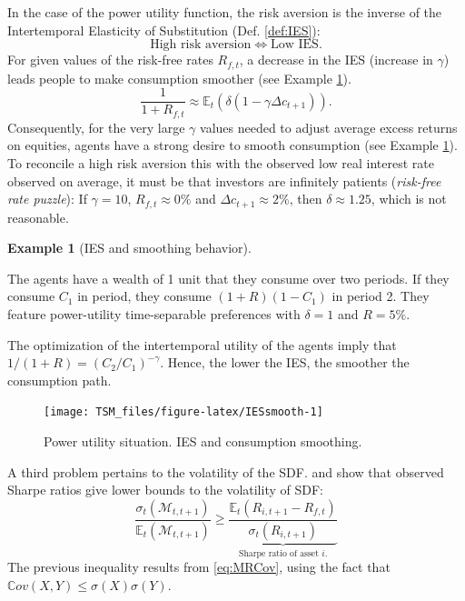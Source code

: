 \documentclass[
  12pt,
]{book}
\theoremstyle{definition}
\theoremstyle{definition}
\newtheorem{example}{Example}[chapter]
\theoremstyle{definition}
\theoremstyle{definition}
\theoremstyle{remark}
\begin{document}
In the case of the power utility function, the risk aversion is the inverse of the Intertemporal Elasticity of Substitution (Def. \ref{def:IES}):
\[
\mbox{High risk aversion} \Leftrightarrow \mbox{Low IES}.
\]
For given values of the risk-free rates \(R_{f,t}\), a decrease in the IES (increase in \(\gamma\)) leads people to make consumption smoother (see Example \ref{exm:IESsmoothing}).
\[
\frac{1}{1+R_{f,t}} \approx \mathbb{E}_t(\delta (1 - \gamma \Delta c_{t+1})).
\]
Consequently, for the very large \(\gamma\) values needed to adjust average excess returns on equities, agents have a strong desire to smooth consumption (see Example \ref{exm:IESsmoothing}). To reconcile a high risk aversion this with the observed low real interest rate observed on average, it must be that investors are infinitely patients (\emph{risk-free rate puzzle}):
If \(\gamma=10\), \(R_{f,t} \approx 0\%\) and \(\Delta c_{t+1} \approx 2\%\), then \(\delta \approx 1.25\), which is not reasonable.

\begin{example}[IES and smoothing behavior]
\protect\hypertarget{exm:IESsmoothing}{}\label{exm:IESsmoothing}

The agents have a wealth of 1 unit that they consume over two periods. If they consume \(C_1\) in period, they consume \((1+R)(1-C_1)\) in period 2. They feature power-utility time-separable preferences with \(\delta=1\) and \(R=5\%\).

The optimization of the intertemporal utility of the agents imply that \(1/(1+R)=(C_2/C_1)^{-\gamma}\). Hence, the lower the IES, the smoother the consumption path.

\begin{figure}
\texttt{[image: TSM\_files/figure-latex/IESsmooth-1]} \caption{Power utility situation. IES and consumption smoothing.}\label{fig:IESsmooth}
\end{figure}

\end{example}

A third problem pertains to the volatility of the SDF. \citet{Grossman_Shiller_1981} and \citet{Hansen_Jagannathan_1991} show that observed Sharpe ratios give lower bounds to the volatility of SDF:
\[
\frac{\sigma_t(\mathcal{M}_{t,t+1})}{\mathbb{E}_t(\mathcal{M}_{t,t+1})} \ge \underbrace{\frac{\mathbb{E}_t(R_{i,t+1}-R_{f,t})}{\sigma_t(R_{i,t+1})}}_{\mbox{Sharpe ratio of asset $i$.}}
\]
The previous inequality results from \eqref{eq:MRCov}, using the fact that \(\mathbb{C}ov(X,Y) \le \sigma(X)\sigma(Y)\).
\end{document}
